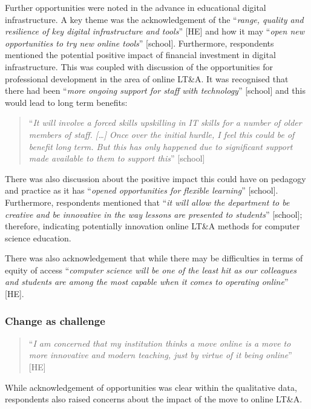 \documentclass[sigconf]{acmart}
\begin{document}
Further opportunities were noted in the advance in educational digital
infrastructure. A key theme was the acknowledgement of the
``{\emph{range, quality and resilience of key digital infrastructure
and tools}}'' [HE] and how it may ``{\emph{open new opportunities to
try new online tools}}'' [school]. Furthermore, respondents mentioned
the potential positive impact of financial investment in digital
infrastructure. This was coupled with discussion of the opportunities
for professional development in the area of online LT\&A. It was
recognised that there had been ``{\emph{more ongoing support for staff
with technology}}'' [school] and this would lead to long term
benefits:

\begin{quotation}
``{\emph{It will involve a forced skills upskilling in IT skills for a
number of older members of staff. […] Once over the initial hurdle, I
feel this could be of benefit long term. But this has only happened
due to significant support made available to them to support this}}''
[school]
\end{quotation}

There was also discussion about the positive impact this could have on
pedagogy and practice as it has ``{\emph{opened opportunities for
    flexible learning}}” [school]. Furthermore, respondents mentioned that
``{\emph{it will allow the department to be creative and be innovative
in the way lessons are presented to students}}'' [school]; therefore,
indicating potentially innovation online LT\&A methods for computer
science education.

There was also acknowledgement that while there may be difficulties in
terms of equity of access ``{\emph{computer science will be one of the
least hit as our colleagues and students are among the most capable
when it comes to operating online}}'' [HE].

\subsubsection*{Change as challenge}

\begin{quotation}
``{\emph{I am concerned that my institution thinks a move online is a
move to more innovative and modern teaching, just by virtue of it
being online}}'' [HE]
\end{quotation}

While acknowledgement of opportunities was clear within the
qualitative data, respondents also raised concerns about the impact of
the move to online LT\&A.
\end{document}
